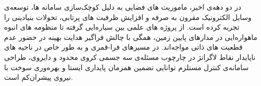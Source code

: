 %
%
%
%
%
%
%

در دو دهه‌ی اخیر، ماموریت های فضایی به دلیل کوچک‌سازی سامانه ها، توسعه‌ی وسایل الکترونیک مقرون به صرفه و افزایش ظرفیت های پرتابی، تحولات بنیادینی را تجربه کرده است. از پروژه های علمی بین سیاره‌ایی گرفته تا منظومه های انبوه ماهواره‌ایی در مدارهای پایین زمین، همگی با چالش فراگیر هدایت بهینه در حضور عدم قطعیت های ذاتی مواجه‌اند. در مسیرهای فرا-قمری
 و به طور خاص در ناحیه های ناپایدار نقاط لاگرانژ در چارچوب مسئله‌ی سه جسمی کروی محدود و دایروی، طراحی سامانه‌ی کنترل مستلزم توانایی تضمین همزمان پایداری ایستا و بهره‌وری سوخت با نیروی پیشران‌کم
 است.

